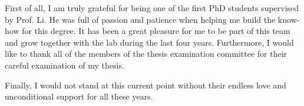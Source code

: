 \acknowledgments

First of all, I am truly grateful for being one of the first PhD students supervised by Prof. Li.
He was full of passion and patience when helping me build the know-how for this degree. It has been a great pleasure for me to be part of this team and grow together with the lab during the last four years. Furthermore, I would like to thank all of the members of the thesis examination committee for their careful examination of my thesis.

Finally, I would not stand at this current point without their endless love and unconditional support for all these years.


\endacknowledgments
